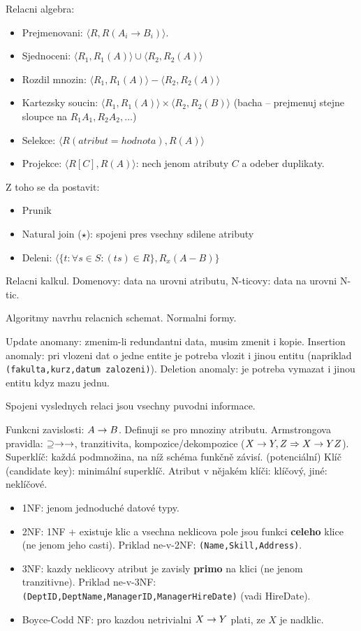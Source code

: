 Relacni algebra:
\begin{itemize}
\item Prejmenovani: $\langle R,R(A_i\rightarrow B_i)\rangle$.
\item Sjednoceni: $\langle R_1,R_1(A)\rangle\cup\langle R_2,R_2(A)\rangle$
\item Rozdil mnozin: $\langle R_1,R_1(A)\rangle - \langle R_2,R_2(A)\rangle$
\item Kartezsky soucin: $\langle R_1,R_1(A)\rangle\times\langle R_2,R_2(B)\rangle$
	(bacha -- prejmenuj stejne sloupce na $R_1 A_1, R_2 A_2,\ldots$)
\item Selekce: $\langle R(atribut=hodnota), R(A)\rangle$
\item Projekce: $\langle R[C],R(A)\rangle$: nech jenom atributy $C$ a odeber
duplikaty.
\end{itemize}
Z toho se da postavit:
\begin{itemize}
\item Prunik
\item Natural join ($\star$): spojeni pres vsechny sdilene atributy
\item Deleni: $\langle\{t:\forall s\in S:(ts)\in R\}, R_x(A-B)\}$
\end{itemize}

Relacni kalkul. Domenovy: data na urovni atributu, N-ticovy: data na urovni
N-tic.

Algoritmy navrhu relacnich schemat.
Normalni formy.

Update anomany: zmenim-li redundantni data, musim zmenit i kopie.
Insertion anomaly: pri vlozeni dat o jedne entite je potreba vlozit i jinou
entitu (napriklad \verb#(fakulta,kurz,datum zalozeni)#).
Deletion anomaly: je potreba vymazat i jinou entitu kdyz mazu jednu.

Spojeni vyslednych relaci jsou vsechny puvodni informace.

Funkcni zavislosti: $A\rightarrow B$. Definuji se pro mnoziny atributu.
Armstrongova pravidla: $\supseteq\rightarrow\rightarrow$, tranzitivita, kompozice/dekompozice
($X\rightarrow Y,Z\Rightarrow X\rightarrow YZ$).
Superklíč: každá podmnožina, na níž schéma funkčně závisí.
(potenciální) Klíč (candidate key): minimální superklíč.
Atribut v nějakém klíči: klíčový, jiné: neklíčové.

\begin{itemize}
\item 1NF: jenom jednoduché datové typy.
\item 2NF: 1NF + existuje klic a vsechna neklicova pole jsou funkci
	\textbf{celeho} klice (ne jenom jeho casti). Priklad ne-v-2NF:
	\verb#(Name,Skill,Address)#.
\item 3NF: kazdy neklicovy atribut je zavisly \textbf{primo} na klici
	(ne jenom tranzitivne).
	Priklad ne-v-3NF: \verb#(DeptID,DeptName,ManagerID,ManagerHireDate)#
	(vadi HireDate).
\item Boyce-Codd NF: pro kazdou netrivialni $X\rightarrow Y$ plati, ze $X$ je nadklic.
\end{itemize}

